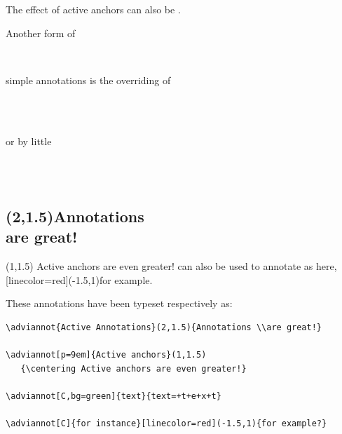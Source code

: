 \documentclass[12pt]{article}
\begin{document}
\medskip
\noindent
The effect of active anchors can also be 
.

\SpecialCoor
{}
  {%
}


\noindent
Another form of
\begin{superpose}
\\
\end{superpose}
simple annotations is the overriding of
\begin{superpose}
\\
\\
\end{superpose}
or by little 
\begin{superpose}
\\
\\
\end{superpose}

\newpage

\subsection*{(2,1.5){Annotations \\are great!}}

\noindent
{}(1,1.5)
{\centering Active anchors are even greater!}
can also be used to annotate  as
here, [linecolor=red](-1.5,1){for example}. 

\medskip

\noindent
These annotations have been typeset respectively as:
\begin{small}
\begin{verbatim}
\adviannot{Active Annotations}(2,1.5){Annotations \\are great!}

\adviannot[p=9em]{Active anchors}(1,1.5)
   {\centering Active anchors are even greater!}

\adviannot[C,bg=green]{text}{text=+t+e+x+t}

\adviannot[C]{for instance}[linecolor=red](-1.5,1){for example?}
\end{verbatim}
\end{small}
\end{document}
